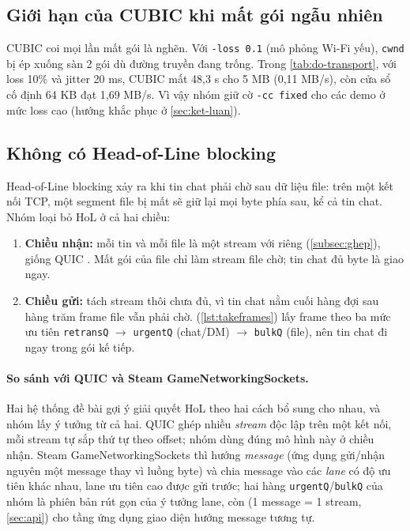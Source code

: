 \subsection{Giới hạn của CUBIC khi mất gói ngẫu nhiên}
\label{subsec:cubic-gioi-han}
CUBIC coi mọi lần mất gói là nghẽn. Với \texttt{-loss 0.1} (mô phỏng Wi-Fi yếu), \texttt{cwnd} bị ép xuống sàn
2 gói dù đường truyền đang trống. Trong \cref{tab:do-transport}, với loss 10\% và jitter 20 ms, CUBIC mất 48,3 s cho 5 MB (0,11 MB/s), còn cửa sổ cố
định 64 KB đạt 1,69 MB/s. Vì vậy nhóm giữ cờ \texttt{-cc fixed} cho các demo ở mức loss cao (hướng khắc phục ở
\cref{sec:ket-luan}).

\subsection{Không có Head-of-Line blocking}
\label{sec:hol}
Head-of-Line blocking xảy ra khi tin chat phải chờ sau dữ liệu file: trên một kết nối TCP, một segment file bị mất
sẽ giữ lại mọi byte phía sau, kể cả tin chat. Nhóm loại bỏ HoL ở cả hai chiều:
\begin{enumerate}
  \item \textbf{Chiều nhận:} mỗi tin và mỗi file là một stream với  riêng (\cref{subsec:ghep}),
        giống QUIC \cite{rfc9000}. Mất gói của file chỉ làm stream file chờ; tin chat đủ byte là giao ngay.
  \item \textbf{Chiều gửi:} tách stream thôi chưa đủ, vì tin chat nằm cuối hàng đợi sau hàng trăm frame file vẫn
        phải chờ.  (\cref{lst:takeframes}) lấy frame theo ba mức ưu tiên \texttt{retransQ}
        $\to$ \texttt{urgentQ} (chat/DM) $\to$ \texttt{bulkQ} (file), nên tin chat đi ngay trong gói kế tiếp.
\end{enumerate}

\paragraph{So sánh với QUIC và Steam GameNetworkingSockets.} Hai hệ thống đề bài gợi ý giải quyết HoL theo hai
cách bổ sung cho nhau, và nhóm lấy ý tưởng từ cả hai. QUIC \cite{rfc9000} ghép nhiều \emph{stream} độc lập trên
một kết nối, mỗi stream tự sắp thứ tự theo offset; nhóm dùng đúng mô hình này ở chiều nhận. Steam
GameNetworkingSockets \cite{valve-gns} thì hướng \emph{message} (ứng dụng gửi/nhận nguyên một message thay vì luồng
byte) và chia message vào các \emph{lane} có độ ưu tiên khác nhau, lane ưu tiên cao được gửi trước; hai hàng
\texttt{urgentQ}/\texttt{bulkQ} của nhóm là phiên bản rút gọn của ý tưởng lane, còn 
(1 message = 1 stream, \cref{sec:api}) cho tầng ứng dụng giao diện hướng message tương tự.

